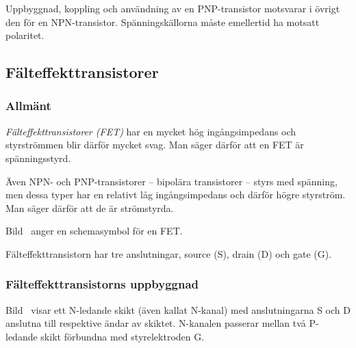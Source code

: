 Uppbyggnad, koppling och användning av en PNP-transistor motsvarar i övrigt den
för en NPN-transistor. Spänningskällorna måste emellertid ha motsatt polaritet.

\newpage %
\subsection{Fälteffekttransistorer}

\subsubsection{Allmänt}

\emph{Fälteffekttransistorer (FET)} har en mycket hög ingångsimpedans och
styrströmmen blir därför mycket svag.
Man säger därför att en FET är spänningsstyrd.

Även NPN- och PNP-transistorer -- bipolära transistorer -- styrs med spänning,
men dessa typer har en relativt låg ingångsimpedans och därför högre styrström.
Man säger därför att de är strömstyrda.



Bild~ anger en schemasymbol för en FET.

Fälteffekttransistorn har tre anslutningar, source (S), drain (D) och gate (G).


\subsubsection{Fälteffekttransistorns uppbyggnad}

Bild~ visar ett N-ledande skikt (även kallat N-kanal) med
anslutningarna S och D anslutna till respektive ändar av skiktet.
N-kanalen passerar mellan två P-ledande skikt förbundna med styrelektroden G.

